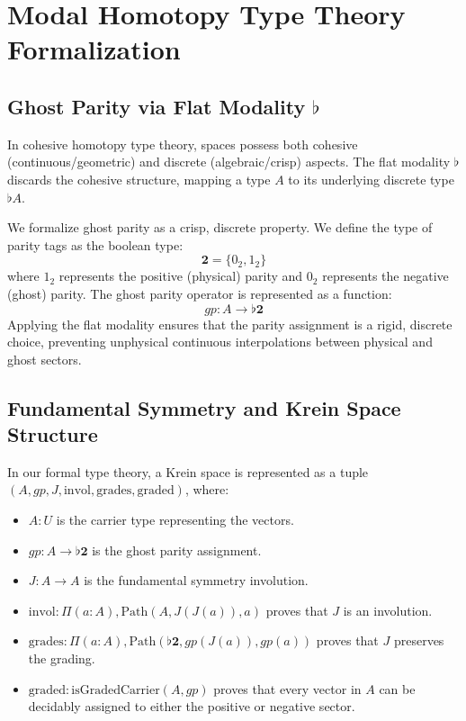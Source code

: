\documentclass{article}
\begin{document}
\section{Modal Homotopy Type Theory Formalization}
\label{sec:mhot}

\subsection{Ghost Parity via Flat Modality $\flat$}
\label{sec:flat}

In cohesive homotopy type theory, spaces possess both cohesive (continuous/geometric) and discrete (algebraic/crisp) aspects. The flat modality $\flat$ discards the cohesive structure, mapping a type $A$ to its underlying discrete type $\flat A$.

We formalize ghost parity as a crisp, discrete property. We define the type of parity tags as the boolean type:
\begin{equation}
    \mathbf{2} = \{ 0_2, 1_2 \}
\end{equation}
where $1_2$ represents the positive (physical) parity and $0_2$ represents the negative (ghost) parity. The ghost parity operator is represented as a function:
\begin{equation}
    gp : A \to \flat \mathbf{2}
\end{equation}
Applying the flat modality ensures that the parity assignment is a rigid, discrete choice, preventing unphysical continuous interpolations between physical and ghost sectors.

\subsection{Fundamental Symmetry and Krein Space Structure}
\label{sec:formal_krein}

In our formal type theory, a Krein space is represented as a tuple $(A, gp, J, \text{invol}, \text{grades}, \text{graded})$, where:
\begin{itemize}
    \item $A : U$ is the carrier type representing the vectors.
    \item $gp : A \to \flat \mathbf{2}$ is the ghost parity assignment.
    \item $J : A \to A$ is the fundamental symmetry involution.
    \item $\text{invol} : \Pi(a:A), \text{Path}(A, J(J(a)), a)$ proves that $J$ is an involution.
    \item $\text{grades} : \Pi(a:A), \text{Path}(\flat\mathbf{2}, gp(J(a)), gp(a))$ proves that $J$ preserves the grading.
    \item $\text{graded} : \text{isGradedCarrier}(A, gp)$ proves that every vector in $A$ can be decidably assigned to either the positive or negative sector.
\end{itemize}
\end{document}
